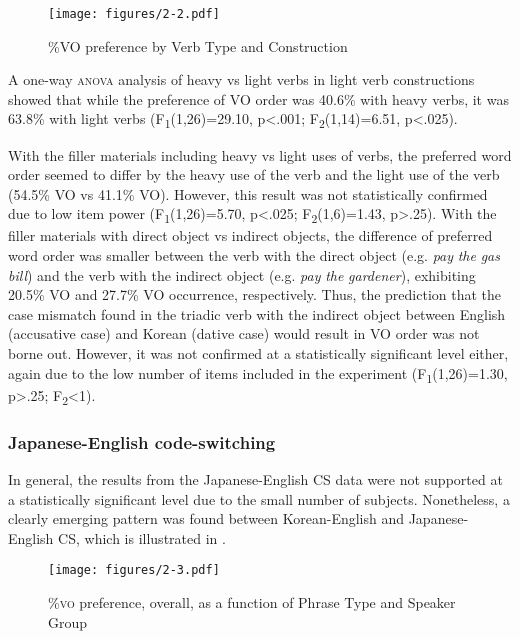 \begin{figure}
\texttt{[image: figures/2-2.pdf]}
\caption{\%\ac{VO} preference by Verb Type and Construction}
\label{fig:2.2}
\end{figure}

A one-way \textsc{anova} analysis of heavy vs light verbs in light verb constructions showed that while the preference of \ac{VO} order was 40.6\% with heavy verbs, it was 63.8\% with light verbs (F\textsubscript{1}(1,26)=29.10, p<.001; F\textsubscript{2}(1,14)=6.51, p<.025).

With the filler materials including heavy vs light uses of verbs, the preferred word order seemed to differ by the heavy use of the verb and the light use of the verb (54.5\% \ac{VO} vs 41.1\% \ac{VO}). However, this result was not statistically confirmed due to low item power (F\textsubscript{1}(1,26)=5.70, p<.025; F\textsubscript{2}(1,6)=1.43, p>.25). With the filler materials with direct object vs indirect objects, the difference of preferred word order was smaller between the verb with the direct object (e.g. \textit{pay} \textit{the} \textit{gas} \textit{bill}) and the verb with the indirect object (e.g. \textit{pay} \textit{the} \textit{gardener}), exhibiting 20.5\% \ac{VO} and 27.7\% \ac{VO} occurrence, respectively. Thus, the prediction that the case mismatch found in the triadic verb with the indirect object between English (accusative case) and Korean (dative case) would result in \ac{VO} order was not borne out. However, it was not confirmed at a statistically significant level either, again due to the low number of items included in the experiment (F\textsubscript{1}(1,26)=1.30, p>.25; F\textsubscript{2}<1). 


\subsubsection{Japanese-English code-switching}\label{ch2:sect:2.1.5.2}

In general, the results from the Japanese-English \ac{CS} data were not supported at a statistically significant level due to the small number of subjects. Nonetheless, a clearly emerging pattern was found between Korean-English and Japanese-English \ac{CS}, which is illustrated in .

\begin{figure}
\texttt{[image: figures/2-3.pdf]}
\caption{\%\textsc{vo} preference, overall, as a function of Phrase Type and Speaker Group} 
\label{fig:2.3}
\end{figure}

